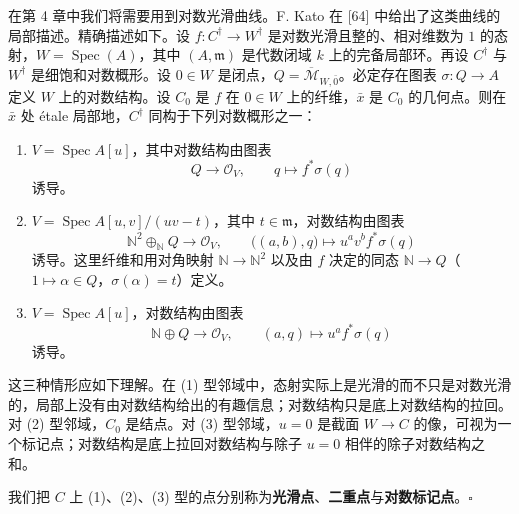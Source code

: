 \begin{example}
在第 4 章中我们将需要用到对数光滑曲线。F. Kato 在 [64] 中给出了这类曲线的局部描述。精确描述如下。设 $f:C^{\dagger}\to W^{\dagger}$ 是对数光滑且整的、相对维数为 $1$ 的态射，$W=\operatorname{Spec}(A)$，其中 $(A,\mathfrak{m})$ 是代数闭域 $k$ 上的完备局部环。再设 $C^{\dagger}$ 与 $W^{\dagger}$ 是细饱和对数概形。设 $0\in W$ 是闭点，$Q=\overline{\mathcal{M}}_{W,\bar 0}$。必定存在图表 $\sigma:Q\to A$ 定义 $W$ 上的对数结构。设 $C_0$ 是 $f$ 在 $0\in W$ 上的纤维，$\bar x$ 是 $C_0$ 的几何点。则在 $\bar x$ 处 étale 局部地，$C^{\dagger}$ 同构于下列对数概形之一：
\begin{enumerate}[label=(\arabic*),leftmargin=2.2em,itemsep=3pt]
\item $V=\operatorname{Spec} A[u]$，其中对数结构由图表
\[
  Q\longrightarrow\mathcal{O}_V,\qquad q\longmapsto f^{*}\sigma(q)
\]
诱导。
\item $V=\operatorname{Spec} A[u,v]/(uv-t)$，其中 $t\in\mathfrak{m}$，对数结构由图表
\[
  \mathbb{N}^2\oplus_{\mathbb{N}}Q\longrightarrow\mathcal{O}_V,\qquad
  \bigl((a,b),q\bigr)\longmapsto u^a v^b f^{*}\sigma(q)
\]
诱导。这里纤维和用对角映射 $\mathbb{N}\to\mathbb{N}^2$ 以及由 $f$ 决定的同态 $\mathbb{N}\to Q$（$1\mapsto\alpha\in Q$，$\sigma(\alpha)=t$）定义。
\item $V=\operatorname{Spec} A[u]$，对数结构由图表
\[
  \mathbb{N}\oplus Q\longrightarrow\mathcal{O}_V,\qquad
  (a,q)\longmapsto u^a f^{*}\sigma(q)
\]
诱导。
\end{enumerate}

这三种情形应如下理解。在 (1) 型邻域中，态射实际上是光滑的而不只是对数光滑的，局部上没有由对数结构给出的有趣信息；对数结构只是底上对数结构的拉回。对 (2) 型邻域，$C_0$ 是结点。对 (3) 型邻域，$u=0$ 是截面 $W\to C$ 的像，可视为一个标记点；对数结构是底上拉回对数结构与除子 $u=0$ 相伴的除子对数结构之和。

我们把 $C$ 上 (1)、(2)、(3) 型的点分别称为\textbf{光滑点}、\textbf{二重点}与\textbf{对数标记点}。\hfill$\square$
\end{example}

